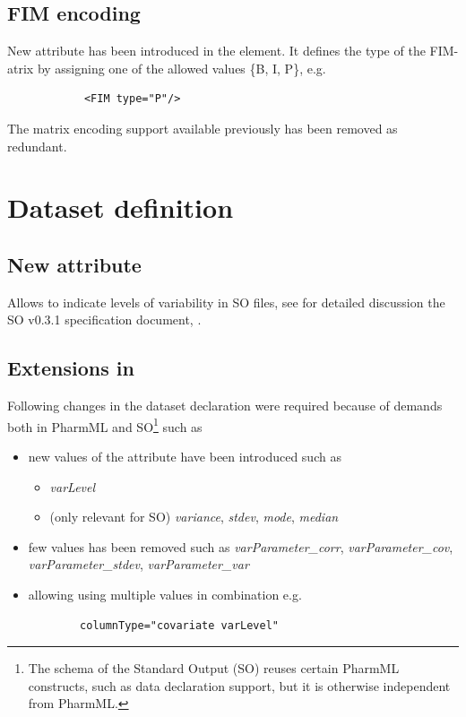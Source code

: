 \subsection{FIM encoding}
New attribute  has been introduced in the  element. It defines 
the type of the FIM-atrix by assigning one of the allowed values \{B, I, P\}, e.g.
\lstset{language=XML}
\begin{lstlisting}
			<FIM type="P"/>
\end{lstlisting}
The matrix encoding support available previously has been removed as redundant.


\section{Dataset definition}

\subsection{New attribute  }
\label{subsec:level}
Allows to indicate levels of variability in SO files, see for detailed discussion the 
SO v0.3.1 specification document, \cite{SO:2016b}.

\subsection{Extensions in  }
\label{subsec:columnType}
Following changes in the dataset declaration were required because of demands both in PharmML 
and SO\footnote{The schema of the Standard Output (SO) reuses certain 
PharmML constructs, such as data declaration support, but it is otherwise 
independent from PharmML.} such as
\begin{itemize}
\item 
new values of the  attribute have been introduced such as
\begin{itemize}
\item 
 \emph{varLevel}
\item 
(only relevant for SO) \emph{variance}, \emph{stdev}, \emph{mode}, \emph{median}
\end{itemize}
\item 
few values has been removed such as \emph{varParameter\_corr}, \emph{varParameter\_cov}, \emph{varParameter\_stdev}, \emph{varParameter\_var}
\item
allowing using multiple values in combination e.g.
\lstset{language=XML}
\begin{lstlisting}
		columnType="covariate varLevel"
\end{lstlisting}
\end{itemize}

